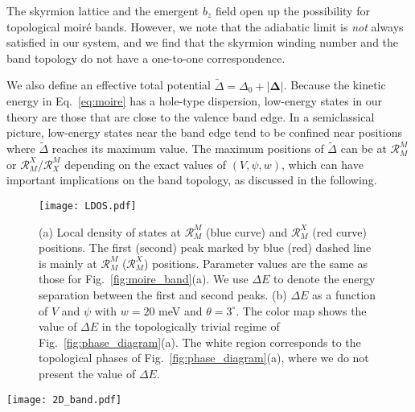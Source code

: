 \documentclass[aps,prx,floatfix,twocolumn]{revtex4-1}
\begin{document}
	
	The skyrmion lattice and the emergent $b_z$ field open up the possibility for topological moir\'e bands. However, we note that the adiabatic limit is {\it not} always satisfied in our system, and we find that the skyrmion winding number and the band topology do not have a one-to-one correspondence.
	
	We also define an effective total potential $\tilde{\Delta}=\Delta_0+|\bm{\Delta}|$. Because the kinetic energy in Eq.~\eqref{eq:moire} has a hole-type dispersion, low-energy states in our theory are those that are close to the valence band edge. In a semiclassical picture, low-energy states near the band edge tend to be confined near positions where $\tilde{\Delta}$ reaches its maximum value. The maximum positions of $\tilde{\Delta}$ can be at $\mathcal{R}_{M}^{M}$ or  $\mathcal{R}_{M}^{X}$/$\mathcal{R}_{X}^{M}$ depending on the exact values of $(V,\psi, w)$, which can have important implications on the band topology, as discussed in the following.
	

	
	
	
	\begin{figure}[t]
	\centering
	\texttt{[image: LDOS.pdf]}
	\caption{(a) Local density of states at $\mathcal{R}_M^M$ (blue curve) and $\mathcal{R}_M^X$ (red curve) positions. The first (second) peak marked by blue (red) dashed line is mainly at $\mathcal{R}_M^M$  ($\mathcal{R}_M^X$) positions. Parameter values are the same as those for Fig.~\ref{fig:moire_band}(a). We use $\Delta E$ to denote the energy separation between the first and second peaks. (b) $\Delta E$ as a function of $V$ and $\psi$ with $w = 20$ meV and $\theta =3^{\circ}$. The color map shows the value of $\Delta E$ in the topologically trivial regime of Fig.~\ref{fig:phase_diagram}(a). The white region corresponds to the topological phases of Fig.~\ref{fig:phase_diagram}(a), where we do not present the value of $\Delta E$.}	
	\label{fig:LDOS}
    \end{figure}	
    
	\begin{figure*}[t]
		\centering
		\texttt{[image: 2D\_band.pdf]}
		\caption{(a)-(e) The first moir\'e valence band in $+K$ valley for different values of $V_z$. The dashed lines mark the Fermi contour at the van Hove energy. Parameter values are $(\theta, V, \psi, w) = (4^{\circ}, 4.4 \text{meV}, 5.9, 20 \text{meV})$. The plotted band is topologically trivial.  (f)-(j) The corresponding density of states for the band shown in (a)-(e). The horizontal axis represents the hole filling factor $n/n_s$. The first moir\'e valence bands are fully filled (empty) at $n/n_s=$0 (1).}	
		\label{fig:2D_band}
	\end{figure*}	    
\end{document}
